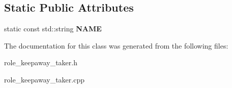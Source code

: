 \subsection*{Static Public Attributes}
\begin{DoxyCompactItemize}
\item 
\hypertarget{classRoleKeepawayTaker_a9390050edd23bf75977ba67031d692f2}{
static const std::string {\bfseries NAME}}
\label{classRoleKeepawayTaker_a9390050edd23bf75977ba67031d692f2}

\end{DoxyCompactItemize}


The documentation for this class was generated from the following files:\begin{DoxyCompactItemize}
\item 
role\_\-keepaway\_\-taker.h\item 
role\_\-keepaway\_\-taker.cpp\end{DoxyCompactItemize}
